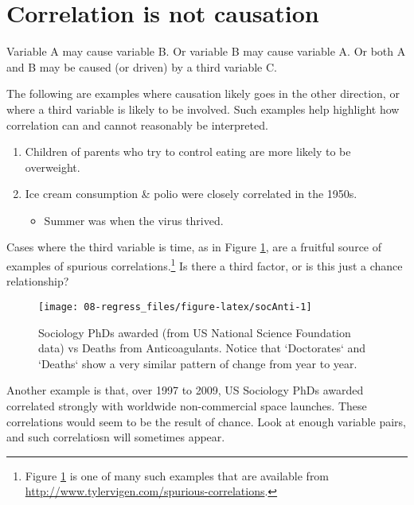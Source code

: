 \documentclass[
  10ptls,
  b5paper]{book}
\providecommand{\tightlist}{%
  \setlength{\itemsep}{0pt}\setlength{\parskip}{0pt}}
\begin{document}
\section{Correlation is not causation}\label{correlation-is-not-causation}

Variable A may cause variable B. Or variable B may cause variable A. Or both A and B may be caused (or driven) by a third variable C.

The following are examples where causation likely goes in the other direction, or where a third variable is likely to be involved. Such examples help highlight how correlation can and cannot reasonably be interpreted.

\begin{enumerate}
\def\labelenumi{\arabic{enumi}.}
\tightlist
\item
  Children of parents who try to control eating are more likely to be overweight.
\item
  Ice cream consumption \& polio were closely correlated in the 1950s.

  \begin{itemize}
  \tightlist
  \item
    Summer was when the virus thrived.
  \end{itemize}
\end{enumerate}

Cases where the third variable is time, as in Figure \ref{fig:socAnti}, are a fruitful source of examples of spurious correlations.\footnote{Figure \ref{fig:socAnti} is one of many such examples that are available from\\
  \url{http://www.tylervigen.com/spurious-correlations}.} Is there a third factor, or is this just a chance relationship?

\begin{figure}

{\centering \texttt{[image: 08-regress\_files/figure-latex/socAnti-1]} 

}

\caption{Sociology PhDs awarded (from US National Science 
Foundation data) vs Deaths from Anticoagulants.  Notice
that `Doctorates` and `Deaths` show a very similar pattern
of change from year to year.}\label{fig:socAnti}
\end{figure}

Another example is that, over 1997 to 2009, US Sociology PhDs awarded correlated strongly with worldwide non-commercial space launches. These correlations would seem to be the result of chance. Look at enough variable pairs, and such correlatiosn will sometimes appear.
\end{document}
